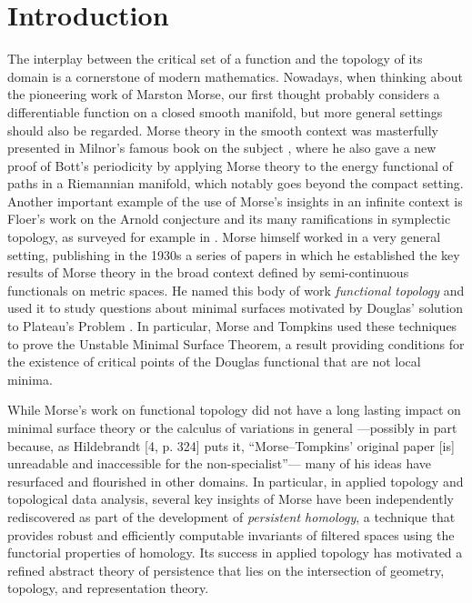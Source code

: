 
\section{Introduction}

The interplay between the critical set of a function and the topology of its domain is a cornerstone of modern mathematics.
Nowadays, when thinking about the pioneering work of Marston Morse, our first thought probably considers a differentiable function on a closed smooth manifold, but more general settings should also be regarded.
Morse theory in the smooth context was masterfully presented in Milnor's famous book on the subject \cite{Milnor.1963}, where he also gave a new proof of Bott's periodicity by applying Morse theory to the energy functional of paths in a Riemannian manifold, which notably goes beyond the compact setting.
Another important example of the use of Morse's insights in an infinite context is Floer's work on the Arnold conjecture and its many ramifications in symplectic topology, as surveyed for example in \cite{Salamon.1999}.
Morse himself worked in a very general setting, publishing in the 1930s a series of papers \cite{Morse.1937, Morse.1938, Morse.1940} in which he established the key results of Morse theory in the broad context defined by semi-continuous functionals on metric spaces.
He named this body of work \emph{functional topology} and used it to study questions about minimal surfaces motivated by Douglas' solution to Plateau’s Problem \cite{Douglas.1931}.
In particular, Morse and Tompkins \cite{Morse.1939, Morse.1941} used these techniques to prove the Unstable Minimal Surface Theorem, a result providing conditions for the existence of critical points of the Douglas functional that are not local minima.

While Morse's work on functional topology did not have a long lasting impact on minimal surface theory or the calculus of variations in general ---possibly in part because, as Hildebrandt [4, p. 324] puts it, ``Morse--Tompkins' original paper [is] unreadable and inaccessible for the non-specialist''---
many of his ideas have resurfaced and flourished in other domains.
In particular, in applied topology and topological data analysis, several key insights of Morse have been independently rediscovered as part of the development of \emph{persistent homology}, a technique that provides robust and efficiently computable invariants of filtered spaces using the functorial properties of homology.
Its success in applied topology has motivated a refined abstract theory of persistence that lies on the intersection of geometry, topology, and representation theory.

